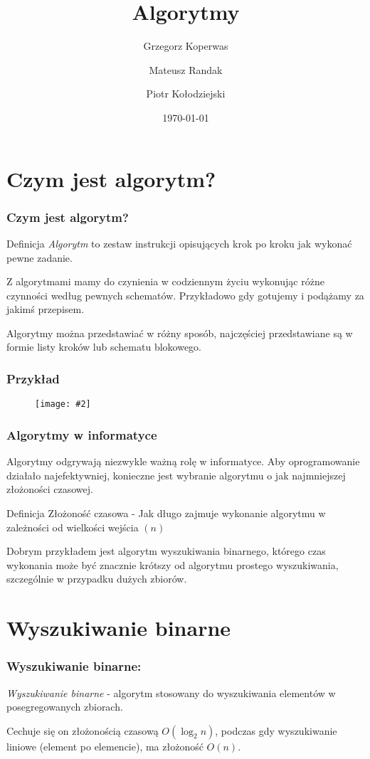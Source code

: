 \documentclass{beamer}
\title{Algorytmy}
\author{Grzegorz Koperwas \and Mateusz Randak \and Piotr Kołodziejski}
\date{\today}
\newcommand{\obrazek}[2]{
        \begin{figure}[h]
            \centering
            \texttt{[image: \#2]}
        \end{figure}
    }
\begin{document}
\begin{frame}
    \titlepage
\end{frame}

\section{Czym jest algorytm?}
\begin{frame}
    \frametitle{Czym jest algorytm?}

    \begin{block}{Definicja}
        \emph{Algorytm} to zestaw instrukcji opisujących krok po kroku jak wykonać pewne zadanie.
    \end{block}

    Z algorytmami mamy do czynienia w codziennym życiu wykonując różne czynności według pewnych schematów. Przykładowo gdy gotujemy i podążamy za jakimś przepisem.

    Algorytmy można przedstawiać w różny sposób, najczęściej przedstawiane są w formie listy kroków lub schematu blokowego.
\end{frame}

\begin{frame}
    \frametitle{Przykład}

    \obrazek{.35}{lista-i-schemat.jpg}

\end{frame}

\begin{frame}
    \frametitle{Algorytmy w informatyce}

    Algorytmy odgrywają niezwykle ważną rolę w informatyce. Aby oprogramowanie działało najefektywniej, konieczne jest wybranie algorytmu o jak najmniejszej złożoności czasowej.

    \begin{block}{Definicja}
        Złożoność czasowa - Jak długo zajmuje wykonanie algorytmu w zależności od wielkości wejścia $\left(n\right)$
    \end{block}

    Dobrym przykładem jest algorytm wyszukiwania binarnego, którego czas wykonania może być znacznie krótszy od algorytmu prostego wyszukiwania, szczególnie w przypadku dużych zbiorów.

\end{frame}

\section{Wyszukiwanie binarne}
\begin{frame}
    \frametitle{Wyszukiwanie binarne:}
    \emph{Wyszukiwanie binarne} - algorytm stosowany do wyszukiwania
    elementów w posegregowanych zbiorach.

    \vspace{1cm}

    Cechuje się on złożonością czasową $O \left(\log_2 n \right)$, podczas gdy wyszukiwanie liniowe (element po elemencie), ma złożoność $O \left( n \right)$.


\end{frame}
\end{document}
